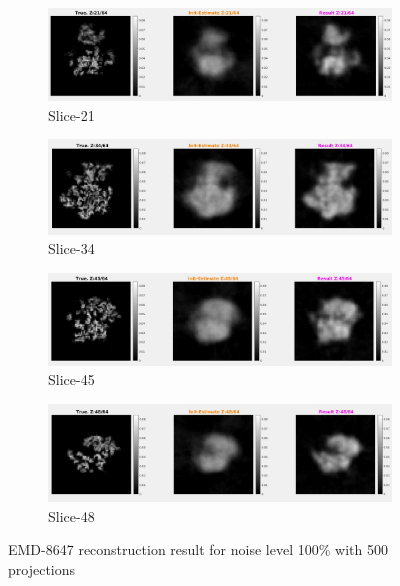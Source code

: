 \documentclass[twoside]{iitbreport}
\begin{document}
\begin{figure}[H]
\centering

\begin{subfigure}{1\textwidth}
\centering
\includegraphics[width=1\linewidth]{emd_8647_result_1.png}
\captionsetup{justification=centering}
\caption{ Slice-21 }
\end{subfigure} 

\begin{subfigure}{1\textwidth}
\centering
\includegraphics[width=1\linewidth]{emd_8647_result_2.png}
\captionsetup{justification=centering}
\caption{ Slice-34 }
\end{subfigure} 

\begin{subfigure}{1\textwidth}
\centering
\includegraphics[width=1\linewidth]{emd_8647_result_3.png}
\captionsetup{justification=centering}
\caption{ Slice-45 }
\end{subfigure} 

\begin{subfigure}{1\textwidth}
\centering
\includegraphics[width=1\linewidth]{emd_8647_result_4.png}
\captionsetup{justification=centering}
\caption{ Slice-48 }
\end{subfigure} 


\caption{EMD-8647 reconstruction result for noise level 100\% with 500 projections}
\label{fig:EMD-8647 Reconstruction: Result-noise 100}
\end{figure}
\end{document}
